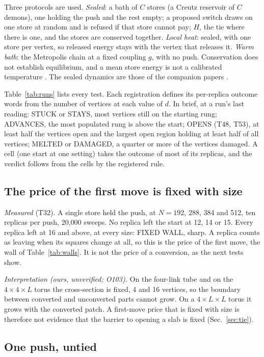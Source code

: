 \documentclass[aps,pre,10pt,twocolumn,superscriptaddress,nofootinbib]{revtex4-2}
\begin{document}
Three protocols are used. \emph{Sealed}: a bath of $C$ stores (a Creutz reservoir of $C$ demons), one holding the
push and the rest empty; a proposed
switch draws on one store at random and is refused if that store cannot pay; $H$, the tie where there is one, and the
stores are conserved together. \emph{Local heat}: sealed, with one store per vertex, so released energy stays with
the vertex that releases it. \emph{Warm bath}: the Metropolis chain at a fixed coupling $g$, with no push.
Conservation does not establish equilibrium, and a mean store energy is not a calibrated temperature \cite{repo}.
The sealed dynamics are those of the companion papers \cite{paper1,paper2}.

Table~\ref{tab:runs} lists every test. Each registration defines its per-replica outcome words from the number of
vertices at each value of $d$. In brief, at a run's last reading: STUCK or STAYS, most vertices still on the starting rung; ADVANCES, the most
populated rung is above the start; OPENS (T48, T53), at least half the vertices open and the largest open region
holding at least half of all vertices; MELTED or DAMAGED, a quarter or more of the vertices damaged. A cell (one
start at one setting) takes the outcome of most of its replicas, and the verdict follows from the cells by the
registered rule.

\subsection{The price of the first move is fixed with size}

\emph{Measured} (T32). A single store held the push, at $N = 192$, 288, 384 and 512, ten replicas per push, 20,000
sweeps. No replica left the start at 12, 14 or 15. Every replica left at 16 and above, at every size: FIXED WALL,
sharp. A replica counts as leaving when its squares change at all, so this is the price of the first move, the wall
of Table~\ref{tab:walls}. It is not the price of a conversion, as the next tests show.

\emph{Interpretation (ours, unverified; O103).} On the four-link tube and on the $4 \times 4 \times L$ torus the
cross-section is fixed, 4 and 16 vertices, so the boundary between converted and unconverted parts cannot grow. On a
$4 \times L \times L$ torus it grows with the converted patch. A first-move price that is fixed with size is
therefore not evidence that the barrier to opening a slab is fixed (Sec.~\ref{sec:tie}).

\subsection{One push, untied}
\end{document}
